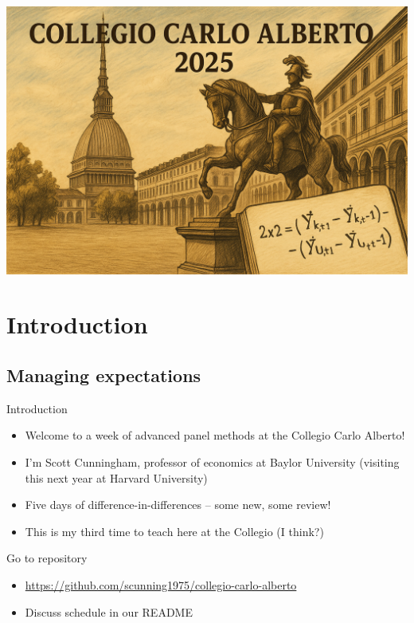 \documentclass{beamer}
\begin{document}
\begin{frame}[plain]  %
\vfill
\begin{center}
  \includegraphics[width=0.85\linewidth]{./lecture_includes/banner_cropped}
\end{center}
\vfill
\end{frame}


\section{Introduction}

\subsection{Managing expectations}


\begin{frame}{Introduction}

\begin{itemize}
\item Welcome to a week of advanced panel methods at the Collegio Carlo Alberto!
\item I'm Scott Cunningham, professor of economics at Baylor University (visiting this next year at Harvard University)
\item Five days of difference-in-differences -- some new, some review!
\item This is my third time to teach here at the Collegio (I think?)
\end{itemize}

\end{frame}

\begin{frame}{Go to repository}

\begin{itemize}
\item \url{https://github.com/scunning1975/collegio-carlo-alberto}
\item Discuss schedule in our README
\end{itemize}

\end{frame}
\end{document}
